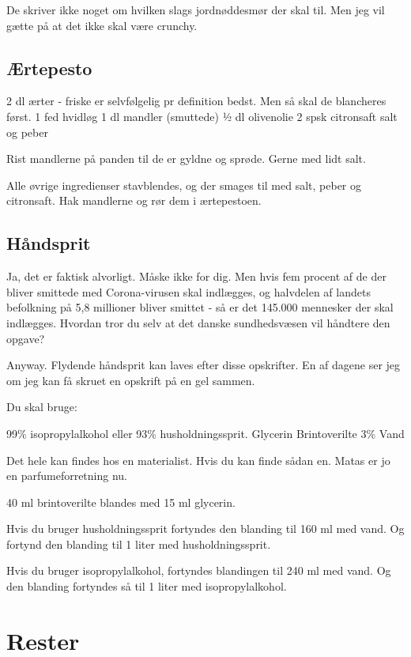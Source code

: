 \documentclass[
]{book}
\begin{document}
De skriver ikke noget om hvilken slags jordnøddesmør der skal til. Men jeg vil gætte på at det ikke skal være crunchy.

\section{Ærtepesto}\label{uxe6rtepesto}

2 dl ærter - friske er selvfølgelig pr definition bedst. Men så skal de blancheres først.
1 fed hvidløg
1 dl mandler (smuttede)
½ dl olivenolie
2 spsk citronsaft
salt og peber

Rist mandlerne på panden til de er gyldne og sprøde. Gerne med lidt salt.

Alle øvrige ingredienser stavblendes, og der smages til med salt, peber og citronsaft. Hak mandlerne og rør dem i ærtepestoen.

\section{Håndsprit}\label{huxe5ndsprit}

Ja, det er faktisk alvorligt. Måske ikke for dig. Men hvis fem procent af de der bliver smittede med Corona-virusen skal indlægges, og halvdelen af landets befolkning på 5,8 millioner bliver smittet - så er det 145.000 mennesker der skal indlægges. Hvordan tror du selv at det danske sundhedsvæsen vil håndtere den opgave?

Anyway. Flydende håndsprit kan laves efter disse opskrifter. En af dagene ser jeg om jeg kan få skruet en opskrift på en gel sammen.

Du skal bruge:

99\% isopropylalkohol eller 93\% husholdningssprit.
Glycerin
Brintoverilte 3\%
Vand

Det hele kan findes hos en materialist. Hvis du kan finde sådan en. Matas er jo en parfumeforretning nu.

40 ml brintoverilte blandes med 15 ml glycerin.

Hvis du bruger husholdningssprit fortyndes den blanding til 160 ml med vand. Og fortynd den blanding til 1 liter med husholdningssprit.

Hvis du bruger isopropylalkohol, fortyndes blandingen til 240 ml med vand. Og den blanding fortyndes så til 1 liter med isopropylalkohol.

\chapter{Rester}\label{rester}
\end{document}

